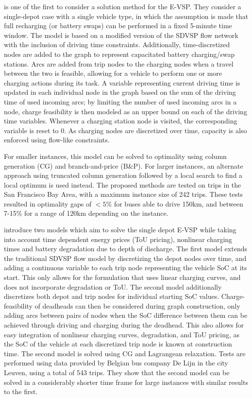 \documentclass[]{article}
\begin{document}
\citet{Li2014} is one of the first to consider a solution method for the E-VSP. They consider a single-depot case with a single vehicle type, in which the assumption is made that full recharging (or battery swaps) can be performed in a fixed 5-minute time window. The model is based on a modified version of the SDVSP flow network with the inclusion of driving time constraints. Additionally, time-discretized nodes are added to the graph to represent capacitated battery charging/swap stations. Arcs are added from trip nodes to the charging nodes when a travel between the two is feasible, allowing for a vehicle to perform one or more charging actions during its task. A variable representing current driving time is updated in each individual node in the graph based on the sum of the driving time of used incoming arcs; by limiting the number of used incoming arcs in a node, charge feasibility is then modeled as an upper bound on each of the driving time variables. Whenever a charging station node is visited, the corresponding variable is reset to 0. As charging nodes are discretized over time, capacity is also enforced using flow-like constraints. 

For smaller instances, this model can be solved to optimality using column generation (CG) and branch-and-price (B\&P). For larger instances, an alternate approach using truncated column generation followed by a local search to find a local optimum is used instead. The proposed methods are tested on trips in the San Francisco Bay Area, with a maximum instance size of 242 trips. These tests resulted in optimality gaps of $<5\%$ for buses able to drive 150km, and between 7-15\%  for a range of 120km depending on the instance.

 introduce two models which aim to solve the single depot E-VSP while taking into account time dependent energy prices (ToU pricing), nonlinear charging times and battery degradation due to depth of discharge. The first model extends the traditional SDVSP flow model by discretizing the depot nodes over time, and adding a continuous variable to each trip node representing the vehicle SoC at its start. This only allows for the formulation that uses linear charging curves, and does not incorporate degradation or ToU. The second model additionally discretizes both depot and trip nodes for individual starting SoC values. Charge-feasibility of deadheads can then be considered during graph construction, only adding arcs between pairs of nodes when the SoC difference between them can be achieved through driving and charging during the deadhead. This also allows for easy integration of nonlinear charging curves, degradation, and ToU pricing, as the SoC of the vehicle at each discretized trip node is known at construction time. The second model is solved using CG and Lagrangean relaxation. Tests are performed using data provided by Belgian bus company De Lijn in the city Leuven, using a total of 543 trips. They show that the second model can be solved in a considerably shorter time frame for large instances with similar results to the first.
\end{document}
